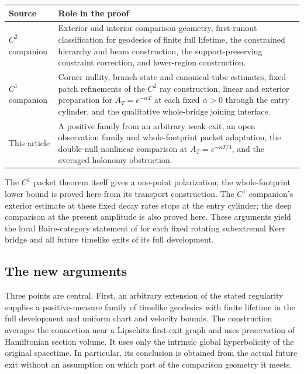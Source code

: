 \begin{center}
\small
\begin{tabular}{@{}>{\raggedright\arraybackslash}p{.20\linewidth}p{.74\linewidth}@{}}
\toprule
Source & Role in the proof\\
\midrule
$C^2$ companion \cite{KerrCTwo}
& Exterior and interior comparison geometry, first-runout classification
for geodesics of finite full lifetime,
the constrained hierarchy and beam construction, the support-preserving
constraint correction, and lower-region construction.\\
$C^1$ companion \cite{KerrCOne}
& Corner nullity, branch-state and canonical-tube estimates, fixed-patch
refinements of the $C^2$ ray construction, linear and exterior preparation
for $A_T=e^{-\alpha T}$ at each fixed $\alpha>0$ through the entry cylinder,
and the qualitative whole-bridge joining interface.\\
This article
& A positive family from an arbitrary weak exit, an open observation
family and whole-footprint packet adaptation, the double-null nonlinear
comparison at $A_T=e^{-\kappa T/4}$, and the averaged holonomy obstruction.\\
\bottomrule
\end{tabular}
\end{center}

The $C^1$ packet theorem itself gives a one-point polarization; the
whole-footprint lower bound is proved here from its transport construction.
The $C^1$ companion's exterior estimate at these fixed decay rates stops at the entry cylinder;
the deep comparison at the present amplitude is also proved here.
These arguments yield the local Baire-category statement of
 for each fixed rotating subextremal Kerr bridge and all
future timelike exits of its full development.

\subsection{The new arguments}

Three points are central.
First, an arbitrary extension of the stated regularity supplies a
positive-measure family of timelike geodesics with finite lifetime
in the full development and uniform chart and velocity bounds.
The construction averages the connection near a Lipschitz
first-exit graph and uses preservation of Hamiltonian section
volume. It uses only the intrinsic global hyperbolicity of the
original spacetime. In particular, its conclusion is obtained from
the actual future exit without an assumption on which part of the
comparison geometry it meets.

